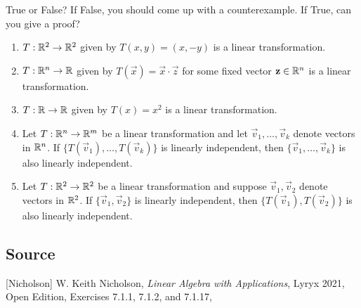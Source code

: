 \documentclass{ximera}
\author{}
\begin{document}
\begin{exercise}

True or False?  If False, you should come up with a counterexample.  If True, can you give a proof?

 \begin{enumerate}
 \item $T : \mathbb{R}^2 \to \mathbb{R}^2$ given by $T(x, y) = (x, -y)$ is a linear transformation.

 \begin{multipleChoice}
 \end{multipleChoice}

 \item $T : \mathbb{R}^n \to \mathbb{R}$ given by $T(\vec{x}) = \vec{x} \cdot \vec{z}$ for some fixed vector $\mathbf{z} \in \mathbb{R}^n$ is a linear transformation.

 \begin{multipleChoice}
 \end{multipleChoice}

\item $T : \mathbb{R} \to \mathbb{R}$ given by $T(x) = x^2$ is a linear transformation.

 \begin{multipleChoice}
 \end{multipleChoice}

 \item Let $T : \mathbb{R}^n \to \mathbb{R}^m$ be a linear transformation and let $\vec{v}_{1}, \dots, \vec{v}_{k}$ denote vectors in $\mathbb{R}^n$.  If $\{T(\vec{v}_{1}), \dots, T(\vec{v}_{k})\}$ is linearly independent, then $\{\vec{v}_{1}, \dots, \vec{v}_{k}\}$ is also linearly independent.

 \begin{multipleChoice}
 \end{multipleChoice}

 \item Let $T : \mathbb{R}^2 \to \mathbb{R}^2$ be a linear transformation and suppose $\vec{v}_{1}, \vec{v}_{2}$ denote vectors in $\mathbb{R}^2$.  If $\{\vec{v}_{1}, \vec{v}_{2}\}$ is linearly independent, then $\{T(\vec{v}_{1}), T(\vec{v}_{2})\}$ is also linearly independent.

 \begin{multipleChoice}
 \end{multipleChoice}
 \end{enumerate}

 
\end{exercise}

\subsection*{Source}
[Nicholson] W. Keith Nicholson, {\it Linear Algebra with Applications}, Lyryx 2021, Open Edition, Exercises 7.1.1, 7.1.2, and 7.1.17, 
\end{document}
